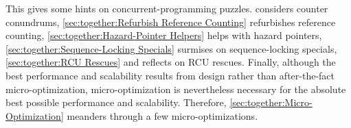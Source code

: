 
%


This 
gives some hints on concurrent-programming puzzles.
considers counter conundrums,
\cref{sec:together:Refurbish Reference Counting}
refurbishes reference counting,
\cref{sec:together:Hazard-Pointer Helpers}
helps with hazard pointers,
\cref{sec:together:Sequence-Locking Specials}
surmises on sequence-locking specials,
\cref{sec:together:RCU Rescues}
and
reflects on RCU rescues.
Finally,
although the best performance and scalability results from design rather
than after-the-fact micro-optimization, micro-optimization is nevertheless
necessary for the absolute best possible performance and scalability.
Therefore,
\cref{sec:together:Micro-Optimization}
meanders through a few micro-optimizations.








